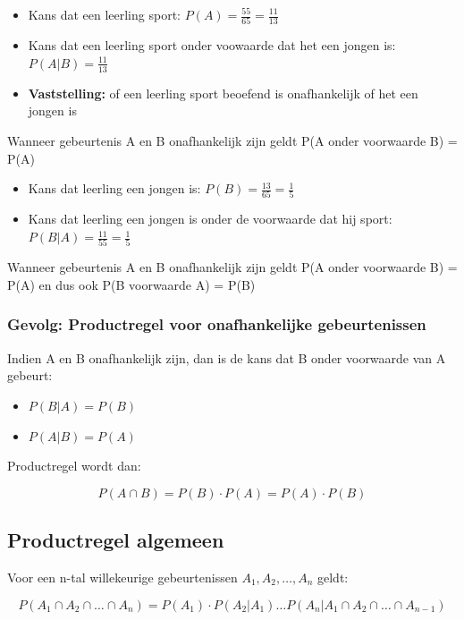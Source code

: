 \documentclass{article}
\begin{document}
\begin{itemize}
    \item Kans dat een leerling sport: $P(A) = \frac{55}{65} = \frac{11}{13}$
    \item Kans dat een leerling sport onder voowaarde dat het een jongen is: $P(A | B) = \frac{11}{13}$
    \item \textbf{Vaststelling:} of een leerling sport beoefend is onafhankelijk of het een jongen is
\end{itemize}

Wanneer gebeurtenis A en B onafhankelijk zijn geldt P(A onder voorwaarde B) = P(A)

\begin{itemize}
    \item Kans dat leerling een jongen is: $P(B) = \frac{13}{65}= \frac15$
    \item Kans dat leerling een jongen is onder de voorwaarde dat hij sport: $P(B|A) = \frac{11}{55}= \frac15$
\end{itemize}

Wanneer gebeurtenis A en B onafhankelijk zijn geldt P(A onder voorwaarde B) = P(A) en dus ook P(B voorwaarde A) = P(B)

\subsubsection{Gevolg: Productregel voor onafhankelijke gebeurtenissen}

Indien A en B onafhankelijk zijn, dan is de kans dat B onder voorwaarde van A gebeurt:

\begin{itemize}
    \item $P(B | A) = P(B)$
    \item $P(A | B) = P(A)$
\end{itemize}

Productregel wordt dan: 

\begin{equation}
    P(A \cap B) = P(B) \cdot P(A) = P(A) \cdot P(B)
\end{equation}

\subsection{Productregel algemeen}

Voor een n-tal willekeurige gebeurtenissen $A_1, A_2, \dots, A_n$ geldt:

\begin{equation}
    P(A_1 \cap A_2 \cap \dots \cap A_n) = P(A_1) \cdot P(A_2 | A_1) \dots P(A_n | A_1 \cap A_2 \cap \dots \cap A_{n-1})
\end{equation}
\end{document}
